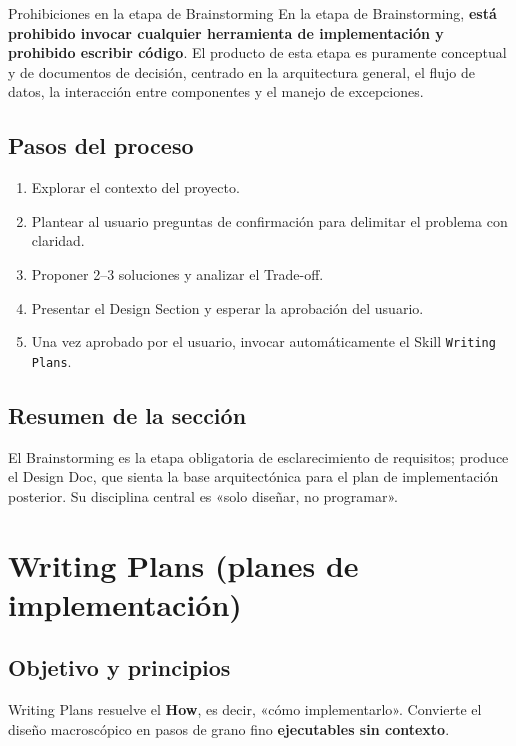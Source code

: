 \documentclass[a4paper]{article}
\begin{document}
\begin{warningbox}{Prohibiciones en la etapa de Brainstorming}
En la etapa de Brainstorming, \textbf{está prohibido invocar cualquier herramienta de implementación y prohibido escribir código}. El producto de esta etapa es puramente conceptual y de documentos de decisión, centrado en la arquitectura general, el flujo de datos, la interacción entre componentes y el manejo de excepciones.
\end{warningbox}

\subsection{Pasos del proceso}

\begin{enumerate}
    \item Explorar el contexto del proyecto.
    \item Plantear al usuario preguntas de confirmación para delimitar el problema con claridad.
    \item Proponer 2--3 soluciones y analizar el Trade-off.
    \item Presentar el Design Section y esperar la aprobación del usuario.
    \item Una vez aprobado por el usuario, invocar automáticamente el Skill \texttt{Writing Plans}.
\end{enumerate}

\subsection{Resumen de la sección}

El Brainstorming es la etapa obligatoria de esclarecimiento de requisitos; produce el Design Doc, que sienta la base arquitectónica para el plan de implementación posterior. Su disciplina central es «solo diseñar, no programar».


\section{Writing Plans (planes de implementación)}

\subsection{Objetivo y principios}

Writing Plans resuelve el \textbf{How}, es decir, «cómo implementarlo». Convierte el diseño macroscópico en pasos de grano fino \textbf{ejecutables sin contexto}.
\end{document}
